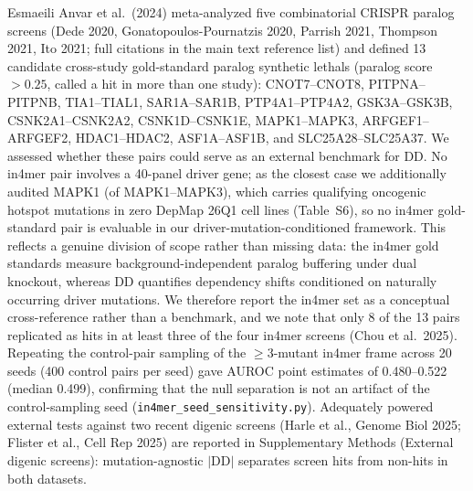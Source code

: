 \documentclass[11pt,a4paper]{article}
\begin{document}
Esmaeili Anvar et al.\ (2024) meta-analyzed five combinatorial CRISPR paralog screens (Dede 2020, Gonatopoulos-Pournatzis 2020, Parrish 2021, Thompson 2021, Ito 2021; full citations in the main text reference list) and defined 13 candidate cross-study gold-standard paralog synthetic lethals (paralog score $>0.25$, called a hit in more than one study): CNOT7--CNOT8, PITPNA--PITPNB, TIA1--TIAL1, SAR1A--SAR1B, PTP4A1--PTP4A2, GSK3A--GSK3B, CSNK2A1--CSNK2A2, CSNK1D--CSNK1E, MAPK1--MAPK3, ARFGEF1--ARFGEF2, HDAC1--HDAC2, ASF1A--ASF1B, and SLC25A28--SLC25A37. We assessed whether these pairs could serve as an external benchmark for DD. No in4mer pair involves a 40-panel driver gene; as the closest case we additionally audited MAPK1 (of MAPK1--MAPK3), which carries qualifying oncogenic hotspot mutations in zero DepMap 26Q1 cell lines (Table~S6), so no in4mer gold-standard pair is evaluable in our driver-mutation-conditioned framework. This reflects a genuine division of scope rather than missing data: the in4mer gold standards measure background-independent paralog buffering under dual knockout, whereas DD quantifies dependency shifts conditioned on naturally occurring driver mutations. We therefore report the in4mer set as a conceptual cross-reference rather than a benchmark, and we note that only 8 of the 13 pairs replicated as hits in at least three of the four in4mer screens (Chou et al.\ 2025). Repeating the control-pair sampling of the $\ge$3-mutant in4mer frame across 20 seeds (400 control pairs per seed) gave AUROC point estimates of 0.480--0.522 (median 0.499), confirming that the null separation is not an artifact of the control-sampling seed (\texttt{in4mer\_seed\_sensitivity.py}). Adequately powered external tests against two recent digenic screens (Harle et al., Genome Biol 2025; Flister et al., Cell Rep 2025) are reported in Supplementary Methods (External digenic screens): mutation-agnostic $|$DD$|$ separates screen hits from non-hits in both datasets.
\end{document}
